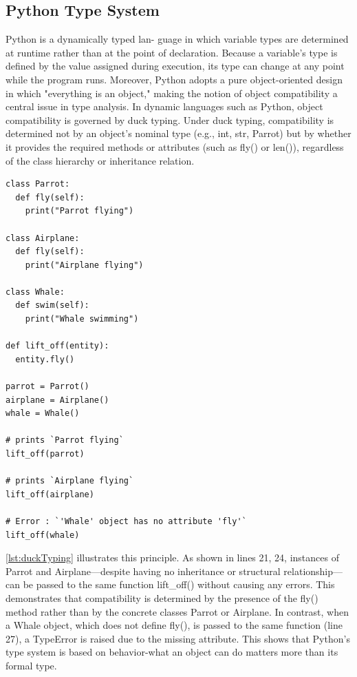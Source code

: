 \subsection{Python Type System}
Python is a dynamically typed lan- guage in which variable types are determined
at runtime rather than at the point of declaration.
Because a variable’s type is defined by the value assigned during execution,
its type can change at any point while the program runs.
Moreover, Python adopts a pure object-oriented design in which "everything is
an object," making the notion of object compatibility a central issue in type
analysis.
In dynamic languages such as Python, object compatibility is governed by duck
typing. Under duck typing, compatibility is determined not by an object’s
nominal type (e.g., int, str, Parrot) but by whether it provides the required
methods or attributes (such as fly() or len()), regardless of the class
hierarchy or inheritance relation.

\begin{listing}[t]
\begin{verbatim}
class Parrot:
  def fly(self):
    print("Parrot flying")

class Airplane:
  def fly(self):
    print("Airplane flying")

class Whale:
  def swim(self):
    print("Whale swimming")

def lift_off(entity):
  entity.fly()

parrot = Parrot()
airplane = Airplane()
whale = Whale()

# prints `Parrot flying`
lift_off(parrot)   

# prints `Airplane flying`
lift_off(airplane) 

# Error : `'Whale' object has no attribute 'fly'`
lift_off(whale)    
\end{verbatim}
\caption{Example Python program demonstrating object compatibility determined by duck typing.}
\label{lst:duckTyping}
\end{listing}

\autoref{lst:duckTyping} illustrates this principle.
As shown in lines 21, 24, instances of Parrot and Airplane—despite having no
inheritance or structural relationship—can be passed to the same function
lift\_off() without causing any errors.
This demonstrates that compatibility is determined by the presence of the fly()
method rather than by the concrete classes Parrot or Airplane. 
In contrast, when a Whale object, which does not define fly(), is passed to the
same function (line 27), a TypeError is raised due to the missing attribute.
This shows that Python’s type system is based on behavior-what an object can
do matters more than its formal type.

